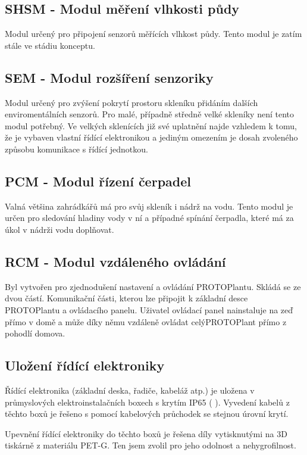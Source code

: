 \subsection{SHSM - Modul měření vlhkosti půdy}
\label{subsec:SHSM}
Modul určený pro připojení senzorů měřících vlhkost půdy.
Tento modul je zatím stále ve stádiu konceptu.

\subsection{SEM - Modul rozšíření senzoriky}
\label{subsec:SEM}
Modul určený pro zvýšení pokrytí prostoru skleníku přidáním dalších enviromentálních senzorů.
Pro malé, případně středně velké skleníky není tento modul potřebný. 
Ve velkých sklenících již své uplatnění najde vzhledem k tomu, že je vybaven vlastní řídící elektronikou a jediným omezením je dosah zvoleného způsobu komunikace s řídící jednotkou.

\subsection{PCM - Modul řízení čerpadel}
\label{subsec:PCM}
Valná většina zahrádkářů má pro svůj skleník i nádrž na vodu.
Tento modul je určen pro sledování hladiny vody v ní a případné spínání čerpadla, které má za úkol v nádrži vodu doplňovat.

\subsection{RCM - Modul vzdáleného ovládání}
\label{subsec:RCM}
Byl vytvořen pro zjednodušení nastavení a ovládání PROTOPlantu.
Skládá se ze dvou částí. 
Komunikační části, kterou lze připojit k základní desce PROTOPlantu a ovládacího panelu. 
Uživatel ovládací panel nainstaluje na zeď přímo v domě a může díky němu vzdáleně ovládat celýPROTOPlant přímo z pohodlí domova. 

\subsection{Uložení řídící elektroniky}
Řídící elektronika (základní deska, řadiče, kabeláž atp.) je uložena v průmyslových elektroinstalačních boxech s krytím IP65 ( \cite{IP_ratings}).
Vyvedení kabelů z těchto boxů je řešeno s pomocí kabelových průchodek se stejnou úrovní krytí.

Upevnění řídící elektroniky do těchto boxů je řešena díly vytisknutými na 3D tiskárně z materiálu PET-G.
Ten jsem zvolil pro jeho odolnost a nehygrofilnost.

